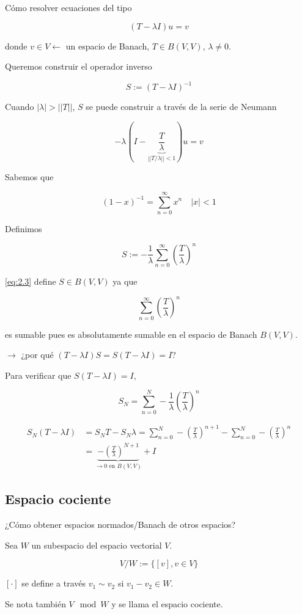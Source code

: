 Cómo resolver ecuaciones del tipo

\[(T-\lambda I)u=v\]

donde $v\in V\leftarrow$ un espacio de Banach, $T\in B(V,V)$, $\lambda\neq 0$.

Queremos construir el operador \color{red} inverso \color{black}

\[S:=(T-\lambda I)^{-1}\]

Cuando $|\lambda|>||T||$, $S$ se puede construir a través de la \color{red} serie de Neumann \color{black}

\[-\lambda (I-\underbrace{\frac{T}{\lambda}}_{||T/\lambda||<1})u=v\]

Sabemos que 

\[(1-x)^{-1}=\sum_{n=0}^\infty x^n\quad |x|<1\]

Definimos 

\begin{equation}S:=-\frac{1}{\lambda}\sum_{n=0}^\infty \left(\frac{T}{\lambda}\right)^n\label{eq:2.3}\end{equation}

\ref{eq:2.3} define $S\in B(V,V)$ ya que

\[\sum_{n=0}^\infty \left(\frac{T}{\lambda}\right)^n\]

es sumable pues es absolutamente sumable en el espacio de Banach $B(V,V)$.

$\rightarrow$ ¿por qué $(T-\lambda I)S=S(T-\lambda I)=I$?

Para verificar que $S(T-\lambda I)=I$, 

\[S_N=\sum_{n=0}^N -\frac{1}{\lambda} \left(\frac{T}{\lambda}\right)^n\]

\begin{align*}S_N(T-\lambda I)&=S_N T-S_N \lambda=\sum_{n=0}^N -\left(\frac{T}{\lambda}\right)^{n+1}-\sum_{n=0}^N -\left(\frac{T}{\lambda}\right)^{n}\\
&=\underbrace{-\left(\frac{T}{\lambda}\right)^{N+1}}_{\to 0 \text{ en }B(V,V)}+I\end{align*}

\subsection{Espacio cociente}

¿Cómo obtener espacios normados/Banach de otros espacios?

\begin{fdefinition}
    Sea $W$ un subespacio del espacio vectorial $V$.

    \[V/W:=\{[v],v\in V\}\]

    $[\cdot]$ se define a través $v_1\sim v_2$ si $v_1-v_2\in W$.

    Se nota también $V\mod W$ y se llama el espacio cociente.
\end{fdefinition}

